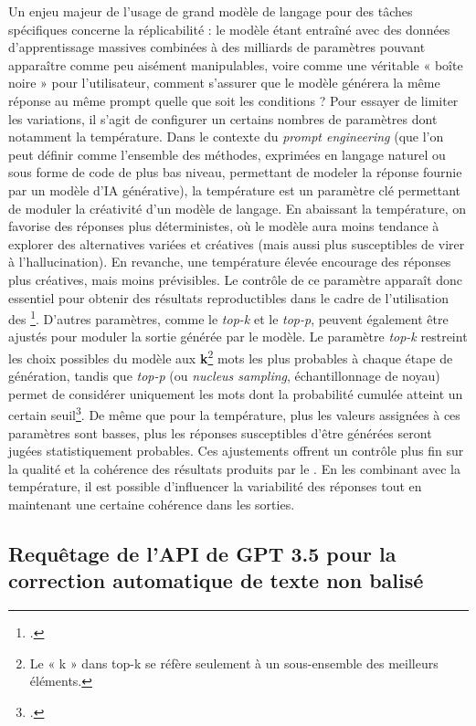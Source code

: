 \newline
Un enjeu majeur de l’usage de grand modèle de langage pour des tâches spécifiques concerne la réplicabilité : le modèle étant entraîné avec des données d’apprentissage massives combinées à des milliards de paramètres pouvant apparaître comme peu aisément manipulables, voire comme une véritable « boîte noire » pour l’utilisateur, comment s’assurer que le modèle générera la même réponse au même prompt quelle que soit les conditions ? Pour essayer de limiter les variations, il s’agit de configurer un certains nombres de paramètres dont notamment la température. 
Dans le contexte du \textit{prompt engineering} (que l’on peut définir comme l’ensemble des méthodes, exprimées en langage naturel ou sous forme de code de plus bas niveau, permettant de modeler la réponse fournie par un modèle d’IA générative), la température est un paramètre clé permettant de moduler la créativité d’un modèle de langage. En abaissant la température, on favorise des réponses plus déterministes, où le modèle aura moins tendance à explorer des alternatives variées et créatives (mais aussi plus susceptibles de virer à l’hallucination). En revanche, une température élevée encourage des réponses plus créatives, mais moins prévisibles. Le contrôle de ce paramètre apparaît donc essentiel pour obtenir des résultats reproductibles dans le cadre de l'utilisation des \llm\footcite{reddy_controlling_2024}.
D'autres paramètres, comme le \textit{top-k} et le \textit{top-p}, peuvent également être ajustés pour moduler la sortie générée par le modèle. Le paramètre \textit{top-k} restreint les choix possibles du modèle aux \textbf{k}\footnote{Le « k » dans top-k se réfère seulement à un sous-ensemble des meilleurs éléments.} mots les plus probables à chaque étape de génération, tandis que \textit{top-p} (ou \textit{nucleus sampling}, échantillonnage de noyau) permet de considérer uniquement les mots dont la probabilité cumulée atteint un certain seuil\footcite{weinmeister_beyond_2024}. De même que pour la température, plus les valeurs assignées à ces paramètres sont basses, plus les réponses susceptibles d’être générées seront jugées statistiquement probables. Ces ajustements offrent un contrôle plus fin sur la qualité et la cohérence des résultats produits par le \llm. En les combinant avec la température, il est possible d’influencer la variabilité des réponses tout en maintenant une certaine cohérence dans les sorties.

\subsection{Requêtage de l’API de GPT 3.5 pour la correction automatique de texte non balisé}
